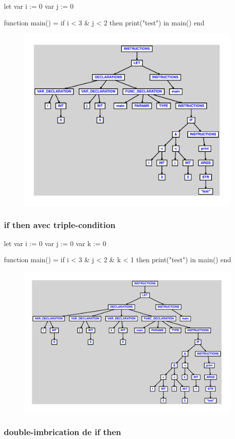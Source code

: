 \documentclass{article}
\begin{document}
\begin{verbatimtab}
let
	var i := 0
	var j := 0

	function main() =
		if i < 3 & j < 2 then
			print("test")
in main() end
\end{verbatimtab}
\begin{figure}[H]\centering\includegraphics[max width=\textwidth]{ast/ast_252.pdf}\end{figure}\subsubsection{if then avec triple-condition}
\begin{verbatimtab}
let
	var i := 0
	var j := 0
	var k := 0

	function main() =
		if i < 3 & j < 2 & k < 1 then
			print("test")
in main() end
\end{verbatimtab}
\begin{figure}[H]\centering\includegraphics[max width=\textwidth]{ast/ast_253.pdf}\end{figure}\subsubsection{double-imbrication de if then}
\end{document}
